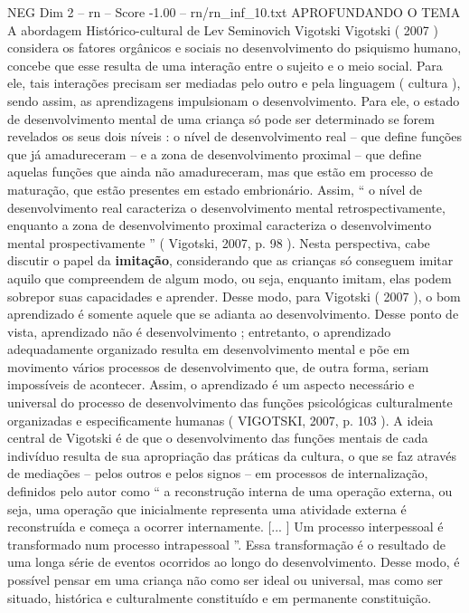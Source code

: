 \begin{textsample}{NEG Dim 2 – rn – Score -1.00 – rn/rn\_inf\_10.txt}  \label{ex:f2_neg_047}
APROFUNDANDO O TEMA A abordagem Histórico-cultural de Lev Seminovich Vigotski Vigotski ( 2007 ) considera os fatores orgânicos e sociais no desenvolvimento do psiquismo humano, concebe que esse resulta de uma interação entre o sujeito e o meio social.
Para ele, tais interações precisam ser mediadas pelo outro e pela linguagem ( cultura ), sendo assim, as aprendizagens impulsionam o desenvolvimento.
Para ele, o estado de desenvolvimento mental de uma criança só pode ser determinado se forem revelados os seus dois níveis : o nível de desenvolvimento real – que define funções que já amadureceram – e a zona de desenvolvimento proximal – que define aquelas funções que ainda não amadureceram, mas que estão em processo de maturação, que estão presentes em estado embrionário.
Assim, “ o nível de desenvolvimento real caracteriza o desenvolvimento mental retrospectivamente, enquanto a zona de desenvolvimento proximal caracteriza o desenvolvimento mental prospectivamente ” ( Vigotski, 2007, p. 98 ).
Nesta perspectiva, cabe discutir o papel da \textbf{imitação}, considerando que as crianças só conseguem imitar aquilo que compreendem de algum modo, ou seja, enquanto imitam, elas podem sobrepor suas capacidades e aprender.
Desse modo, para Vigotski ( 2007 ), o bom aprendizado é somente aquele que se adianta ao desenvolvimento.
Desse ponto de vista, aprendizado não é desenvolvimento ; entretanto, o aprendizado adequadamente organizado resulta em desenvolvimento mental e põe em movimento vários processos de desenvolvimento que, de outra forma, seriam impossíveis de acontecer.
Assim, o aprendizado é um aspecto necessário e universal do processo de desenvolvimento das funções psicológicas culturalmente organizadas e especificamente humanas ( VIGOTSKI, 2007, p. 103 ).
A ideia central de Vigotski é de que o desenvolvimento das funções mentais de cada indivíduo resulta de sua apropriação das práticas da cultura, o que se faz através de mediações – pelos outros e pelos signos – em processos de internalização, definidos pelo autor como “ a reconstrução interna de uma operação externa, ou seja, uma operação que inicialmente representa uma atividade externa é reconstruída e começa a ocorrer internamente. [... ] Um processo interpessoal é transformado num processo intrapessoal ”.
Essa transformação é o resultado de uma longa série de eventos ocorridos ao longo do desenvolvimento.
Desse modo, é possível pensar em uma criança não como ser ideal ou universal, mas como ser situado, histórica e culturalmente constituído e em permanente constituição.

\end{textsample}

